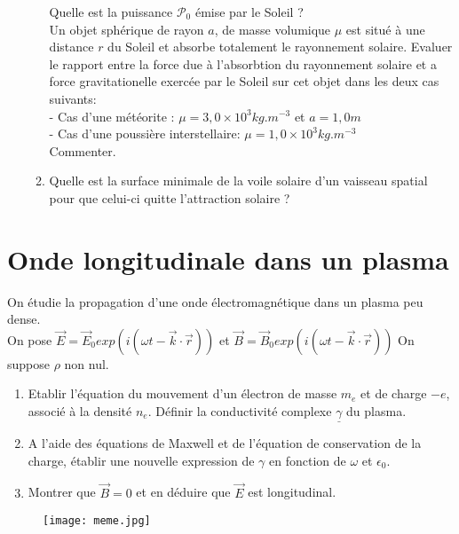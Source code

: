 \documentclass{article}
\begin{document}
\begin{enumerate}
\begin{enumerate}
    Quelle est la puissance $\mathcal{P_0}$ émise par le Soleil ? \\
    Un objet sphérique de rayon $a$, de masse volumique $\mu$ est situé à une distance $r$ du Soleil et absorbe totalement le rayonnement solaire. Evaluer le rapport entre la force due à l'absorbtion du rayonnement solaire et a force gravitationelle exercée par le Soleil sur cet objet dans les deux cas suivants:\\
    - Cas d'une météorite : $\mu = 3,0\times10^3 kg.m^{-3}$ et $a=1,0m$\\
    - Cas d'une poussière interstellaire: $\mu=1,0\times10^3kg.m^{-3}$
    \\ Commenter.
    \item Quelle est la surface minimale de la voile solaire d'un vaisseau spatial pour que celui-ci quitte l'attraction solaire ?  \\[2cm]
    \end{enumerate}
\end{enumerate}

\section{Onde longitudinale dans un plasma}

On étudie la propagation d'une onde électromagnétique dans un plasma peu dense. \\
On pose $\vec{E} = \vec{E}_0 exp(i(\omega t - \vec{k} \cdot \vec{r}))$ et $\vec{B} = \vec{B}_0 exp(i(\omega t - \vec{k} \cdot \vec{r} ))$
On suppose $\rho$ non nul. 

\begin{enumerate}
  \item Etablir l'équation du mouvement d'un électron de masse $m_e$ et de charge $-e$, associé à la densité $n_e$. Définir la conductivité complexe $\underline{\gamma}$ du plasma. 
  \item A l'aide des équations de Maxwell et de l'équation de conservation de la charge, établir une nouvelle expression de $\gamma$ en fonction de $\omega$ et $\epsilon_0$. 
  \item Montrer que $\vec{B}=0$ et en déduire que $\vec{E}$ est longitudinal. \\[2cm]
\end{enumerate}

\begin{figure}[h]
  \centering
  \texttt{[image: meme.jpg]}
\end{figure}
\end{document}
